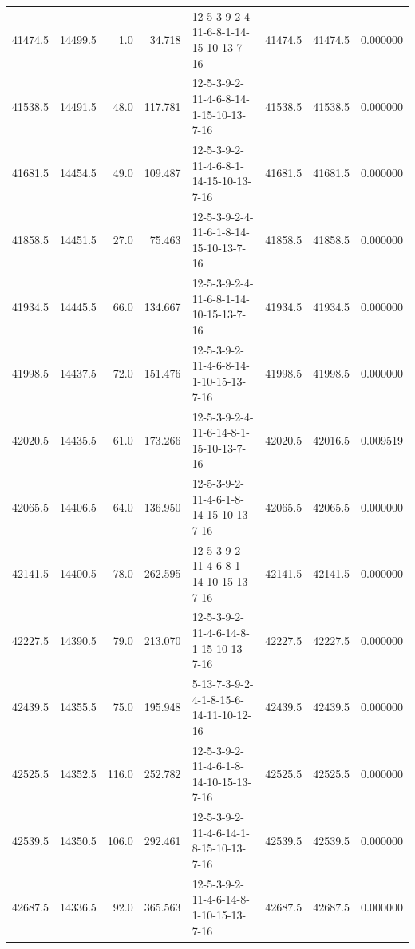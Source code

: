 \begin{tabular}{rrrrlrrr}
 41474.5 &  14499.5 &            1.0 &             34.718 &  12-5-3-9-2-4-11-6-8-1-14-15-10-13-7-16 &       41474.5 &         41474.5 &  0.000000 \\
 41538.5 &  14491.5 &           48.0 &            117.781 &  12-5-3-9-2-11-4-6-8-14-1-15-10-13-7-16 &       41538.5 &         41538.5 &  0.000000 \\
 41681.5 &  14454.5 &           49.0 &            109.487 &  12-5-3-9-2-11-4-6-8-1-14-15-10-13-7-16 &       41681.5 &         41681.5 &  0.000000 \\
 41858.5 &  14451.5 &           27.0 &             75.463 &  12-5-3-9-2-4-11-6-1-8-14-15-10-13-7-16 &       41858.5 &         41858.5 &  0.000000 \\
 41934.5 &  14445.5 &           66.0 &            134.667 &  12-5-3-9-2-4-11-6-8-1-14-10-15-13-7-16 &       41934.5 &         41934.5 &  0.000000 \\
 41998.5 &  14437.5 &           72.0 &            151.476 &  12-5-3-9-2-11-4-6-8-14-1-10-15-13-7-16 &       41998.5 &         41998.5 &  0.000000 \\
 42020.5 &  14435.5 &           61.0 &            173.266 &  12-5-3-9-2-4-11-6-14-8-1-15-10-13-7-16 &       42020.5 &         42016.5 &  0.009519 \\
 42065.5 &  14406.5 &           64.0 &            136.950 &  12-5-3-9-2-11-4-6-1-8-14-15-10-13-7-16 &       42065.5 &         42065.5 &  0.000000 \\
 42141.5 &  14400.5 &           78.0 &            262.595 &  12-5-3-9-2-11-4-6-8-1-14-10-15-13-7-16 &       42141.5 &         42141.5 &  0.000000 \\
 42227.5 &  14390.5 &           79.0 &            213.070 &  12-5-3-9-2-11-4-6-14-8-1-15-10-13-7-16 &       42227.5 &         42227.5 &  0.000000 \\
 42439.5 &  14355.5 &           75.0 &            195.948 &  5-13-7-3-9-2-4-1-8-15-6-14-11-10-12-16 &       42439.5 &         42439.5 &  0.000000 \\
 42525.5 &  14352.5 &          116.0 &            252.782 &  12-5-3-9-2-11-4-6-1-8-14-10-15-13-7-16 &       42525.5 &         42525.5 &  0.000000 \\
 42539.5 &  14350.5 &          106.0 &            292.461 &  12-5-3-9-2-11-4-6-14-1-8-15-10-13-7-16 &       42539.5 &         42539.5 &  0.000000 \\
 42687.5 &  14336.5 &           92.0 &            365.563 &  12-5-3-9-2-11-4-6-14-8-1-10-15-13-7-16 &       42687.5 &         42687.5 &  0.000000 \\

\end{tabular}
